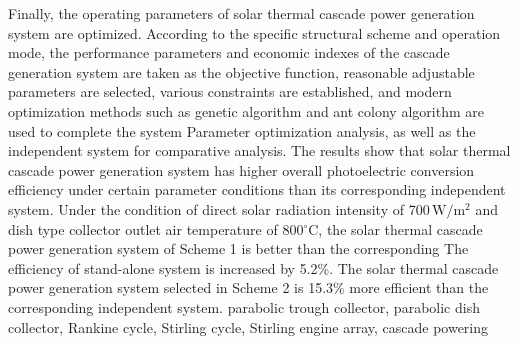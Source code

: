 {Finally, the operating parameters of solar thermal cascade power generation system are optimized. According to the specific structural scheme and operation mode, the performance parameters and economic indexes of the cascade generation system are taken as the objective function, reasonable adjustable parameters are selected, various constraints are established, and modern optimization methods such as genetic algorithm and ant colony algorithm are used to complete the system Parameter optimization analysis, as well as the independent system for comparative analysis. The results show that solar thermal cascade power generation system has higher overall photoelectric conversion efficiency under certain parameter conditions than its corresponding independent system. Under the condition of direct solar radiation intensity of 700\,$\mathrm{W/m^2}$ and dish type collector outlet air temperature of 800$\mathrm{^\circ C}$, the solar thermal cascade power generation system of Scheme 1 is better than the corresponding The efficiency of stand-alone system is increased by 5.2\%. The solar thermal cascade power generation system selected in Scheme 2 is 15.3\% more efficient than the corresponding independent system.
}
\enkeywords
{parabolic trough collector, parabolic dish collector, Rankine cycle, Stirling cycle, Stirling engine array, cascade powering}